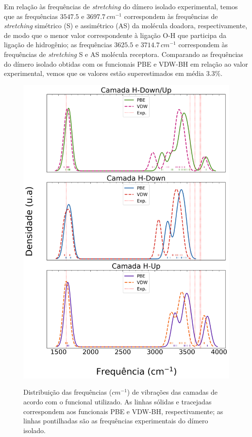 Em relação às frequências de \textit{stretching} do dímero isolado experimental, temos que as frequências $3547.5$ e $3697.7\,\si{cm}^{-1}$ correspondem às frequências de \textit{stretching} simétrico (S) e assimétrico (AS) da molécula doadora, respectivamente, de modo que o menor valor correspondente à ligação O-H que participa da ligação de hidrogênio; as frequências $3625.5$ e $3714.7\,\si{cm}^{-1}$ correspondem às frequências de \textit{stretching} S e AS molécula receptora. Comparando as frequências do dímero isolado obtidas com os funcionais PBE e VDW-BH em relação ao valor experimental, vemos que os valores estão superestimados em média $ 3.3\% $. 
\begin{figure}[t!]
	\centering
	\caption{Distribuição das frequências ($\si{cm}^{-1}$) de vibrações das camadas de acordo com o funcional utilizado. As linhas sólidas e tracejadas correspondem aos funcionais PBE e VDW-BH, respectivamente; as linhas pontilhadas são as frequências experimentais do dímero isolado.}
	\includegraphics[scale=0.4]{figs/graph_pbe.png}
	\label{fig:modos}
\end{figure}

